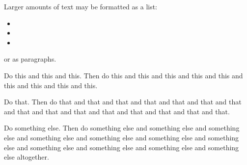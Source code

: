 Larger amounts of text may be formatted as a list:
\begin{itemize}
\item {} 
\item {} 
\item {}
\end{itemize}
or as paragraphs.

\nix{}Do this and this and this. Then do this
and this and this
and this and this
and this and this
and this and this.

\win{}Do that. Then do that
and that and that
and that and that
and that and that
and that and that
and that and that
and that and that
and that and that.

\osx{}Do something else. 
Then do something else and 
something else and
something else and
something else and
something else and
something else and
something else and
something else and
something else and
something else and
something else altogether.





